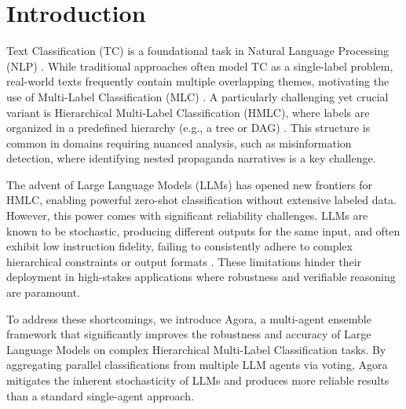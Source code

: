 \section{Introduction}

Text Classification (TC) is a foundational task in Natural Language Processing (NLP) \citep{Zangari2024}. While traditional approaches often model TC as a single-label problem, real-world texts frequently contain multiple overlapping themes, motivating the use of Multi-Label Classification (MLC) \citep{Hu2025,TidakeSane2018}. A particularly challenging yet crucial variant is Hierarchical Multi-Label Classification (HMLC), where labels are organized in a predefined hierarchy (e.g., a tree or DAG) \citep{liu2023recentadvanceshierarchicalmultilabel}. This structure is common in domains requiring nuanced analysis, such as misinformation detection, where identifying nested propaganda narratives is a key challenge.

The advent of Large Language Models (LLMs) has opened new frontiers for HMLC, enabling powerful zero-shot classification without extensive labeled data. However, this power comes with significant reliability challenges. LLMs are known to be stochastic, producing different outputs for the same input, and often exhibit low instruction fidelity, failing to consistently adhere to complex hierarchical constraints or output formats \citep{Qin2024InFoBench}. These limitations hinder their deployment in high-stakes applications where robustness and verifiable reasoning are paramount.

To address these shortcomings, we introduce Agora, a multi-agent ensemble framework that significantly improves the robustness and accuracy of Large Language Models on complex Hierarchical Multi-Label Classification tasks. By aggregating parallel classifications from multiple LLM agents via voting, Agora mitigates the inherent stochasticity of LLMs and produces more reliable results than a standard single-agent approach.